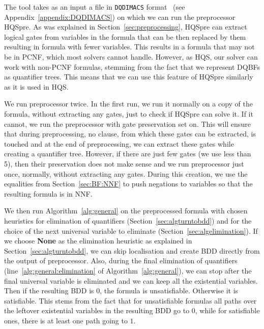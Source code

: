 \documentclass[
  digital, %
  color,
  twoside, %
  table,   %
  nolof,     %
  nolot,     %
]{fithesis3}
\theoremstyle{definition}
\theoremstyle{remark}
\newcommand{\DQDIMACS}[0]{\texttt{DQDIMACS}}
\newcommand{\QEnone}{\textbf{None}}
\begin{document}
The tool takes as an input a file in \DQDIMACS{} format~\cite{iDQandDQDIMACS} (see Appendix~\ref{appendix:DQDIMACS}) on which we can run the preprocessor HQSpre. As was explained in Section~\ref{sec:preprocessing}, HQSpre can extract logical gates from variables in the formula that can be then replaced by them resulting in formula with fewer variables. This results in a formula that may not be in PCNF, which most solvers cannot handle. However, as HQS, our solver can work with non-PCNF formulas, stemming from the fact that we represent DQBFs as quantifier trees. This means that we can use this feature of HQSpre similarly as it is used in HQS.

We run preprocessor twice. 
In the first run, we run it normally on a copy of the formula, without extracting any gates, just to check if HQSpre can solve it. If it cannot, we run the preprocessor with gate preservation set on. This will ensure that during preprocessing, no clause, from which these gates can be extracted, is touched and at the end of preprocessing, we can extract these gates while creating a quantifier tree. However, if there are just few gates (we use less than 5), then their preservation does not make sense and we run preprocessor just once, normally, without extracting any gates. During this creation, we use the equalities from Section~\ref{sec:BF:NNF} to push negations to variables so that the resulting formula is in NNF.

We then run Algorithm~\ref{alg:general} on the preprocessed formula with chosen heuristics for elimination of quantifiers (Section~\ref{sec:algturntobdd}) and for the choice of the next universal variable to eliminate (Section~\ref{sec:algelimination}). If we choose \QEnone{} as the elimination heuristic as explained in Section~\ref{sec:algturntobdd}, we can skip localisation and create BDD directly from the output of preprocessor. Also, during the final elimination of quantifiers (line~\ref{alg:general:elimination} of Algorithm~\ref{alg:general}), we can stop after the final universal variable is eliminated and we can keep all the existential variables. Then if the resulting BDD is $0$, the formula is unsatisfiable. Otherwise it is satisfiable. This stems from the fact that for unsatisfiable formulas all paths over the leftover existential variables in the resulting BDD go to $0$, while for satisfiable ones, there is at least one path going to $1$.
\end{document}
